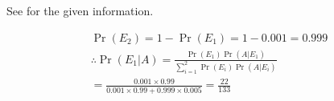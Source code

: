 See 
 for the given information.
\begin{table}[H]

\caption{}
\label{tab:ncert/12/13/3/5/1}
\end{table}
%
\begin{align}   
\Pr(E_2) = 1 - \Pr(E_1)
 = 1 -0.001
 = 0.999
 \\
  \therefore  \Pr(E_1|A) = \frac{\Pr(E_1)\Pr(A|E_1)}{\sum_{i=1}^{2}\Pr(E_i)\Pr(A|E_i)}\\
     = \frac{0.001\times 0.99}{0.001\times0.99 + 0.999\times0.005}
      = \frac{22}{133}
\end{align}


